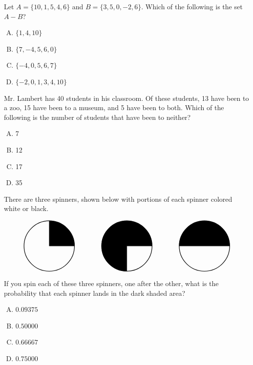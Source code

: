 \documentclass[12pt,letterpaper]{exam}
\begin{document}
\begin{questions}
\newpage
\vfill


\question Let $A= \{ 10, 1, 5, 4, 6 \}$ and $B= \{ 3, 5, 0, -2, 6 \}$. Which of the following is the set $A - B$?
	\begin{enumerate}[A.]
	\item $\{ 1, 4, 10 \}$
	\item $\{ 7, -4, 5, 6, 0 \}$
	\item $\{ -4, 0, 5, 6, 7 \}$
	\item $\{ -2, 0, 1, 3, 4, 10 \}$
	\end{enumerate}

\vfill

\question Mr. Lambert has 40 students in his classroom. Of these students, 13 have been to a zoo, 15 have been to a museum, and 5 have been to both. Which of the following is the number of students that have been to neither?
	\begin{enumerate}[A.]
	\item 7
	\item 12
	\item 17
	\item 35
	\end{enumerate} 

\vfill

\question There are three spinners, shown below with portions of each spinner colored white or black.\par
	\[
	\begin{tikzpicture}
	\draw[line width=0.03cm] (0,0) circle (1.3);
	\draw[fill=black] (0,0) -- (1.3,0) arc[start angle=0, end angle=90,radius=1.3] -- (0,0);
	
	\draw[line width=0.03cm] (4,0) circle (1.3);
	\draw[fill=black] (4,0) -- (5.3,0) arc[start angle=0, end angle=270,radius=1.3] -- (4,0);

	\draw[line width=0.03cm] (8,0) circle (1.3);
	\draw[fill=black] (8,0) -- (9.3,0) arc[start angle=0, end angle=180,radius=1.3] -- (8,0);
	\end{tikzpicture} 
	\]
If you spin each of these three spinners, one after the other, what is the probability that each spinner lands in the dark shaded area?
	\begin{enumerate}[A.]
	\item $0.09375$
	\item $0.50000$
	\item $0.66667$
	\item $0.75000$
	\end{enumerate}


\end{questions}
\end{document}
